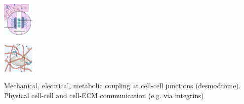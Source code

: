\begin{minipage}{0.2\linewidth}
    \includegraphics[width=15mm]{src/Images/cell-cell.png}
\end{minipage}
\begin{minipage}{0.23\linewidth}
    \includegraphics[width=15mm]{src/Images/cell-ecm.png}
\end{minipage}\begin{minipage}{0.5\linewidth}
    Mechanical, electrical, metabolic coupling at cell-cell junctions (desmodrome).\\
    Physical cell-cell and cell-ECM communication (e.g. via integrins)\\
\end{minipage}

